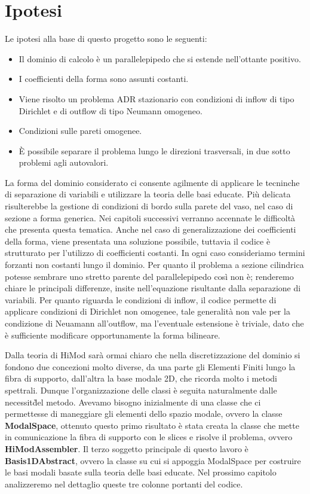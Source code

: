 \section{Ipotesi}\label{sec: ipotesi}

Le ipotesi alla base di questo progetto sono le seguenti:

\begin{itemize}
\item Il dominio di calcolo \`e un parallelepipedo che si estende nell'ottante positivo.
\item I coefficienti della forma sono assunti costanti.
\item Viene risolto un problema ADR stazionario con condizioni di inflow di tipo Dirichlet e di outflow di tipo Neumann omogeneo.
\item Condizioni sulle pareti omogenee.
\item \`E possibile separare il problema lungo le direzioni trasversali, in due sotto problemi agli autovalori.
\end{itemize}

La forma del dominio considerato ci consente agilmente di applicare le tecninche di separazione di variabili e utilizzare la teoria delle basi educate. Pi\`u delicata risulterebbe la gestione di condizioni di bordo sulla parete del vaso, nel caso di sezione a forma generica. Nei capitoli successivi verranno accennate le difficolt\`a che presenta questa tematica.
Anche nel caso di generalizzazione dei coefficienti della forma, viene presentata una soluzione possibile, tuttavia il codice \`e strutturato per l'utilizzo di coefficienti costanti. In ogni caso consideriamo termini forzanti non costanti lungo il dominio.
Per quanto il problema a sezione cilindrica potesse sembrare uno stretto parente del parallelepipedo cos\`i non \`e; renderemo chiare le principali differenze, insite nell'equazione risultante dalla separazione di variabili.
Per quanto riguarda le condizioni di inflow, il codice permette di applicare condizioni di Dirichlet non omogenee, tale generalit\`a non vale per la condizione di Neuamann all'outflow, ma l'eventuale estensione \`e triviale, dato che \`e sufficiente modificare opportunamente la forma bilineare.

Dalla teoria di HiMod sar\`a ormai chiaro che nella discretizzazione del dominio si fondono due concezioni molto diverse, da una parte gli Elementi Finiti lungo la fibra di supporto, dall'altra la base modale 2D, che ricorda molto i metodi spettrali. 
Dunque l'organizzazione delle classi \`e seguita naturalmente dalle necessit\`del metodo. Avevamo bisogno inizialmente di una classe che ci permettesse di maneggiare gli elementi dello spazio modale, ovvero la classe \textbf{ModalSpace}, ottenuto questo primo risultato \`e stata creata la classe che mette in comunicazione la fibra di supporto con le slices e risolve il problema, ovvero \textbf{HiModAssembler}. Il terzo soggetto principale di questo lavoro \`e \textbf{Basis1DAbstract}, ovvero la classe su cui si appoggia ModalSpace per costruire le basi modali basate sulla teoria delle basi educate.
Nel prossimo capitolo analizzeremo nel dettaglio queste tre colonne portanti del codice.